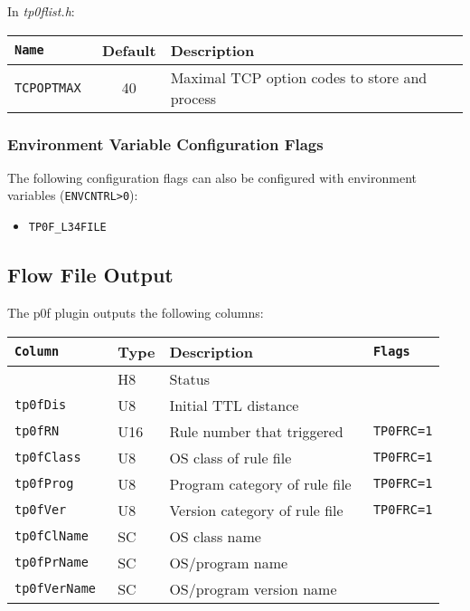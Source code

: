 \documentclass[documentation]{subfiles}
\begin{document}
In {\em tp0flist.h}:

\begin{longtable}{>{\tt}lcl}
    \toprule
    {\bf Name} & {\bf Default} & {\bf Description}\\
    \midrule\endhead%
    TCPOPTMAX  & 40            & Maximal TCP option codes to store and process\\
    \bottomrule
\end{longtable}

\subsubsection{Environment Variable Configuration Flags}
The following configuration flags can also be configured with environment variables ({\tt ENVCNTRL>0}):
\begin{itemize}
    \item {\tt TP0F\_L34FILE}
\end{itemize}

\subsection{Flow File Output}
The p0f plugin outputs the following columns:
\begin{longtable}{>{\tt}lll>{\tt\small}l}
    \toprule
    {\bf Column} & {\bf Type} & {\bf Description} & {\bf Flags}\\
    \midrule\endhead%
    \nameref{tp0fStat} & H8  & Status                         & \\
    tp0fDis            & U8  & Initial TTL distance           & \\
    tp0fRN             & U16 & Rule number that triggered     & TP0FRC=1\\
    tp0fClass          & U8  & OS class of rule file          & TP0FRC=1\\
    tp0fProg           & U8  & Program category of rule file  & TP0FRC=1\\
    tp0fVer            & U8  & Version category of rule file  & TP0FRC=1\\
    tp0fClName         & SC  & OS class name                  & \\
    tp0fPrName         & SC  & OS/program name                & \\
    tp0fVerName        & SC  & OS/program version name        & \\
    \bottomrule
\end{longtable}
\end{document}
